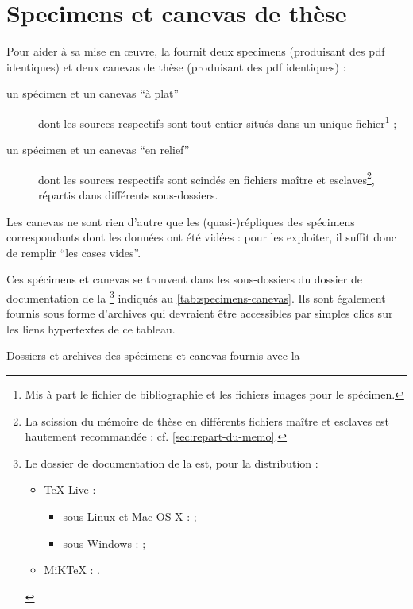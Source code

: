 \chapter{Specimens et canevas de thèse}\label{cha:specimen-canevas}%
%


Pour aider à sa mise en œuvre, la \yatcl fournit deux specimens (produisant
des \gls{pdf} identiques) et deux canevas de thèse (produisant des \gls{pdf}
identiques) :
\begin{description}
\item[un spécimen et un canevas \enquote{à plat}] dont les sources 
  respectifs sont tout entier situés dans un unique fichier\footnote{Mis à part
    le fichier de bibliographie et les fichiers images pour le spécimen.} ;
\item[un spécimen et un canevas \enquote{en relief}] dont les sources
   respectifs sont scindés en fichiers maître et
  esclaves\footnote{La scission du mémoire de thèse en différents fichiers
    maître et esclaves est hautement recommandée :
    cf. \vref{sec:repart-du-memo}.}, répartis dans différents sous-dossiers.
\end{description}
Les canevas ne sont rien d'autre que les (quasi-)répliques des spécimens
correspondants dont les données ont été vidées : pour les exploiter, il suffit
donc de remplir \enquote{les cases vides}.

%
Ces spécimens et canevas se trouvent dans les sous-dossiers du dossier de
documentation de la \yatcl{}\footnote{Le dossier de documentation de la
  \yatcl{} est, pour la distribution :
  \begin{itemize}
  \item \TeX{} Live :
    \begin{itemize}
    \item sous Linux et Mac OS X :
      \unixtldirectory\tldistdirectory\jobdocdirectory{} ;
    \item sous Windows :
      \wintldirectory\tldistdirectory\jobdocdirectory{} ;
    \end{itemize}
  \item MiK\TeX{} : \miktexdistdirectory.
  \end{itemize}
  \label{fn:yathesisdocfolder}} indiqués au \vref{tab:specimens-canevas}. Ils
sont également fournis sous forme d'archives  qui devraient être
accessibles par simples clics sur les liens hypertextes de ce tableau.
\begin{table}
  \centering
  
  \caption{Dossiers et archives  des spécimens et canevas fournis
    avec la \yatcl{}}
  \label{tab:specimens-canevas}
\end{table}

